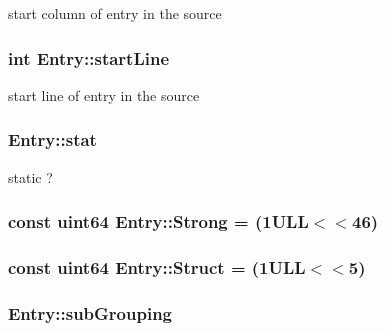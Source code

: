 start column of entry in the source 

\hypertarget{class_entry_a81bf40c0a6646dc1e33097d7e2552c96}{}
\subsubsection[{start\+Line}]{\setlength{\rightskip}{0pt plus 5cm}int Entry\+::start\+Line}\label{class_entry_a81bf40c0a6646dc1e33097d7e2552c96}


start line of entry in the source 

\hypertarget{class_entry_ab5f1d92a0b5d8abdf4d42cefc134fdfa}{}
\subsubsection[{stat}]{ Entry\+::stat}\label{class_entry_ab5f1d92a0b5d8abdf4d42cefc134fdfa}


static ? 

\hypertarget{class_entry_a4f025cdbdb27c73efe7f6f5c9af9113e}{}
\subsubsection[{Strong}]{\setlength{\rightskip}{0pt plus 5cm}const {\bf uint64} Entry\+::\+Strong = (1\+U\+L\+L$<$$<$46)\hspace{0.3cm}{\ttfamily [static]}}\label{class_entry_a4f025cdbdb27c73efe7f6f5c9af9113e}
\hypertarget{class_entry_a62352fd788f44f3b34541092e3bee1a2}{}
\subsubsection[{Struct}]{\setlength{\rightskip}{0pt plus 5cm}const {\bf uint64} Entry\+::\+Struct = (1\+U\+L\+L$<$$<$5)\hspace{0.3cm}{\ttfamily [static]}}\label{class_entry_a62352fd788f44f3b34541092e3bee1a2}
\hypertarget{class_entry_a095b43379529186300dd6a8d8830d5dc}{}
\subsubsection[{sub\+Grouping}]{ Entry\+::sub\+Grouping}\label{class_entry_a095b43379529186300dd6a8d8830d5dc}


